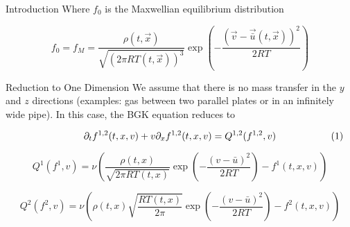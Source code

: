 \documentclass[unknownkeysallowed,final]{beamer}
\begin{document}
\begin{frame}{}
\begin{textblock}{19.5}
\begin{block}{\small{Introduction}}
Where $f_{0}$ is the Maxwellian equilibrium distribution

\begin{equation*}
\label{f0}
f_{0} = f_{M} = \frac{\rho(t, \vec{x})}{\sqrt{(2 \pi RT(t, \vec{x}))^{3}}} \exp \left( -\frac{( \vec{v}- \vec{\bar{u}}(t, \vec{x}))^{2}}{2RT} \right)
\end{equation*}

\end{block}

\begin{block}{\small{Reduction to One Dimension}}
We assume that there is no mass transfer in the $y$ and $z$ directions (examples: gas between two parallel plates or in an infinitely wide pipe). In this case, the BGK equation reduces to

\begin{equation*}
\label{bgk1d1}
\partial_{t} f^{1,2}(t,x,v) + v \partial_{x} f^{1,2}(t,x,v) = Q^{1,2}(f^{1,2},v)
\lefteqn{\hspace{20mm}(1)}
\end{equation*}


\begin{equation*}
\label{Q1}
Q^{1}(f^{1},v) = \nu \left( \frac{\rho(t, x)}{\sqrt{2 \pi RT(t, x)}} \exp \left( - \frac{(v - \bar{u})^{2}}{2RT} \right) - f^{1}(t, x, v) \right)
\end{equation*}

\begin{equation*}
\label{Q2}
Q^{2}(f^{2},v) = \nu \left( \rho(t, x) \sqrt{ \frac{RT(t, x)}{2 \pi}} \exp \left( - \frac{(v - \bar{u})^{2}}{2RT} \right) - f^{2}(t, x, v) \right)
\end{equation*}





\end{block}
\end{textblock}
\end{frame}
\end{document}
